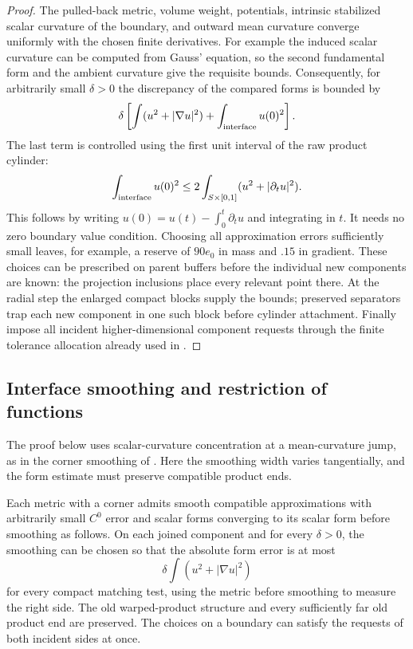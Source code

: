 \begin{proof}
The pulled-back metric, volume weight, potentials, intrinsic stabilized scalar curvature of the boundary, and outward mean curvature converge uniformly with the
chosen finite derivatives.  For example the induced scalar curvature
can be computed from Gauss' equation, so the second fundamental form
and the ambient curvature give the requisite bounds.  Consequently,
for arbitrarily small $\delta>0$ the discrepancy of the compared forms
is bounded by
\[
 \delta\left[\int(u^2+|\nabla u|^2)+\int_{\rm interface}u(0)^2\right].
\]
The last term is controlled using the first unit interval of the raw
product cylinder:
\begin{equation}\label{regular:trace}
 \int_{\rm interface}u(0)^2
 \le 2\int_{S\times[0,1]}(u^2+|\partial_tu|^2).
\end{equation}
This follows by writing $u(0)=u(t)-\int_0^t\partial_tu$ and integrating
in $t$.  It needs no zero boundary value condition.  Choosing all approximation
errors sufficiently small leaves, for example, a reserve of $90e_0$
in mass and $.15$ in gradient.  These choices can be prescribed on
parent buffers before the individual new components are known: the
projection inclusions place every relevant point there.  At the radial
step the enlarged compact blocks supply the bounds; preserved
separators trap each new component in one such block before cylinder
attachment.  Finally impose all incident higher-dimensional component requests through the finite
tolerance allocation already used in .
\end{proof}

\subsection{Interface smoothing and restriction of functions}

The proof below uses scalar-curvature concentration at a mean-curvature
jump, as in the corner smoothing of
\citet[Sections~2--3]{miao2002Corners}.  Here the smoothing width varies
tangentially, and the form estimate must preserve compatible product ends.

\begin{lemma}\label{regular:interface}
Each metric with a corner admits smooth compatible approximations
with arbitrarily small $C^0$ error and scalar forms converging to its
scalar form before smoothing as follows.  On each joined component and for every
$\delta>0$, the smoothing can be chosen so that the absolute form
error is at most
\[
 \delta\int(u^2+|\nabla u|^2)
\]
for every compact matching test, using the metric before smoothing to measure the
right side.  The old warped-product structure and every sufficiently
far old product end are preserved.  The choices on a boundary can satisfy
the requests of both incident sides at once.
\end{lemma}

